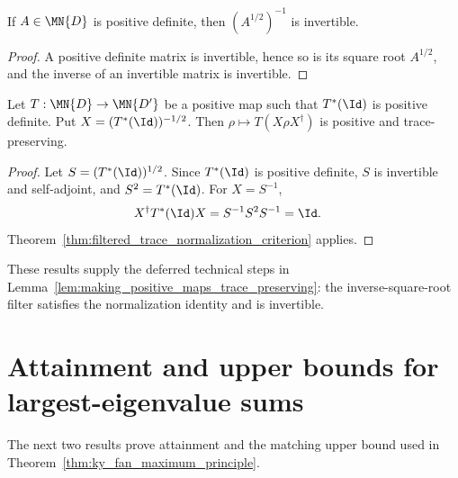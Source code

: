\begin{lemma}
    \label{lem:pos_def_inv_sqrt_invertible}
    \leanok
    \uses{}
    If $A\in\MN{D}$ is positive definite, then $(A^{1/2})^{-1}$ is
    invertible.
\end{lemma}

\begin{proof}\leanok
    A positive definite matrix is invertible, hence so is its square root
    $A^{1/2}$, and the inverse of an invertible matrix is invertible.
\end{proof}

\begin{theorem}
    \label{thm:trace_normalization_inverse_square_root}
    \leanok
    Let $T:\MN{D}\to\MN{D'}$ be a positive map such that $T^*(\Id)$ is positive
    definite. Put $X=(T^*(\Id))^{-1/2}$. Then
    $\rho\mapsto T(X\rho X^\dagger)$ is positive and trace-preserving.
\end{theorem}

\begin{proof}\leanok
    Let $S=(T^*(\Id))^{1/2}$. Since $T^*(\Id)$ is positive definite, $S$ is
    invertible and self-adjoint, and $S^2=T^*(\Id)$. For $X=S^{-1}$,
    \begin{align}
        X^\dagger T^*(\Id)X
         & =S^{-1}S^2S^{-1}=\Id.
        \notag
    \end{align}
    Theorem~\ref{thm:filtered_trace_normalization_criterion} applies.
\end{proof}

These results supply the deferred technical steps in
Lemma~\ref{lem:making_positive_maps_trace_preserving}: the inverse-square-root
filter satisfies the normalization identity and is invertible.

\section{Attainment and upper bounds for largest-eigenvalue sums}

The next two results prove attainment and the matching upper bound used in
Theorem~\ref{thm:ky_fan_maximum_principle}.

